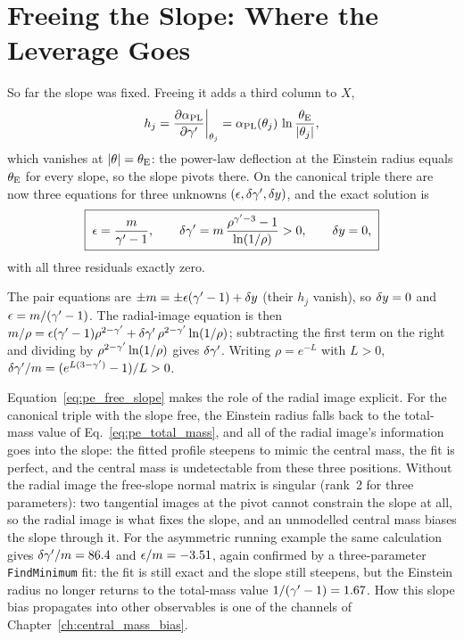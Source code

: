 \section{Freeing the Slope: Where the Leverage Goes}
\label{sec:pe_free_slope}

So far the slope was fixed. Freeing it adds a third column to $X$,
\begin{equation}
    h_j=\frac{\partial \alpha_{\rm PL}}{\partial \gamma'}\bigg|_{\theta_j}
    =\alpha_{\rm PL}(\theta_j)\,\ln\frac{\theta_{\mathrm{E}}}{|\theta_j|} ,
    \label{eq:pe_hcolumn}
\end{equation}
which vanishes at $|\theta|=\theta_{\mathrm{E}}$: the power-law deflection at the
Einstein radius equals $\theta_{\mathrm{E}}$ for every slope, so the slope
pivots there. On the canonical triple there are now three equations for
three unknowns $(\epsilon,\delta\gamma',\delta y)$, and the exact solution
is
\begin{equation}
    \boxed{\;
    \epsilon=\frac{m}{\gamma'-1},\qquad
    \delta\gamma'=m\,\frac{\rho^{\gamma'-3}-1}{\ln(1/\rho)}>0,\qquad
    \delta y=0,\;}
    \label{eq:pe_free_slope}
\end{equation}
with all three residuals exactly zero.

\begin{derivation}
The pair equations are $\pm m=\pm\epsilon(\gamma'-1)+\delta y$ (their
$h_j$ vanish), so $\delta y=0$ and $\epsilon=m/(\gamma'-1)$. The
radial-image equation is then
$m/\rho=\epsilon(\gamma'-1)\rho^{2-\gamma'}+\delta\gamma'\,\rho^{2-\gamma'}\ln(1/\rho)$;
subtracting the first term on the right and dividing by
$\rho^{2-\gamma'}\ln(1/\rho)$ gives $\delta\gamma'$. Writing $\rho=e^{-L}$ with
$L>0$, $\delta\gamma'/m=(e^{L(3-\gamma')}-1)/L>0$.
\end{derivation}

Equation~\eqref{eq:pe_free_slope} makes the role of the radial image
explicit. For the canonical triple with the slope free, the Einstein
radius falls back to the
total-mass value of Eq.~\eqref{eq:pe_total_mass}, and all of the
radial image's information goes into the slope: the fitted profile
steepens to mimic the central mass, the fit is perfect, and the central
mass is undetectable from these three positions. Without the radial
image the free-slope normal matrix is singular (rank~2 for three
parameters): two tangential images at the pivot cannot constrain the
slope at all, so the radial image is what fixes the slope, and an
unmodelled central mass biases the slope through it. For the asymmetric
running example the same calculation gives $\delta\gamma'/m=86.4$ and
$\epsilon/m=-3.51$, again confirmed by a three-parameter
\texttt{FindMinimum} fit: the fit is still exact and the slope still
steepens, but the Einstein radius no longer returns to the total-mass
value $1/(\gamma'-1)=1.67$. How this slope bias propagates into other
observables is one of the channels of
Chapter~\ref{ch:central_mass_bias}.

